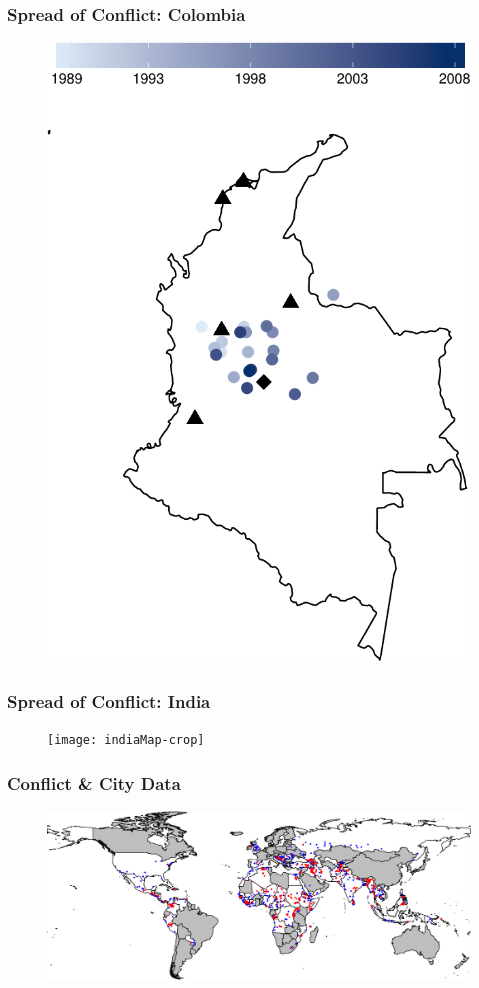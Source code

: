 \begin{frame}
\frametitle{Spread of Conflict: Colombia}

\vspace{-8mm}
\begin{figure}[ht]
	\centering
	\includegraphics[width=.5\textwidth]{colombiaMap-crop}
\end{figure}

\end{frame}

\begin{frame}
\frametitle{Spread of Conflict: India}

\vspace{-8mm}
\begin{figure}[ht]
	\centering
	\texttt{[image: indiaMap-crop]}
\end{figure}

\end{frame}

\begin{frame}
\frametitle{Conflict \& City Data}

\begin{figure}[ht]
  \centering
  \includegraphics[width=1\textwidth]{CityConfMap-crop}
\end{figure}

\end{frame}

